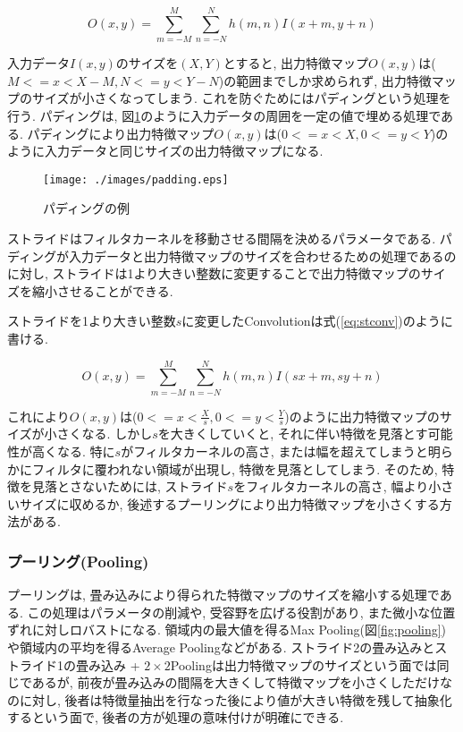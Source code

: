 \begin{equation}
  O(x, y) = \sum_{m=-M}^M \sum_{n=-N}^N h(m,n)I(x+m, y+n) \label{eq:conv1}
\end{equation}

入力データ$I(x, y)$のサイズを$(X, Y)$とすると, 出力特徴マップ$O(x, y)$は($M<=x<X-M, N<=y<Y-N$)の範囲までしか求められず, 出力特徴マップのサイズが小さくなってしまう. これを防ぐためにはパディングという処理を行う. パディングは, 図\ref{fig:padding}のように入力データの周囲を一定の値で埋める処理である. パディングにより出力特徴マップ$O(x, y)$は($0<=x<X, 0<=y<Y$)のように入力データと同じサイズの出力特徴マップになる.  
\begin{figure}[H]
  \centering
  \texttt{[image: ./images/padding.eps]}
  \caption{パディングの例}
  \label{fig:padding}
\end{figure}

ストライドはフィルタカーネルを移動させる間隔を決めるパラメータである. パディングが入力データと出力特徴マップのサイズを合わせるための処理であるのに対し, ストライドは1より大きい整数に変更することで出力特徴マップのサイズを縮小させることができる.  

ストライドを1より大きい整数$s$に変更したConvolutionは式(\ref{eq:stconv})のように書ける.

\begin{equation}
 O(x, y) = \sum_{m=-M}^M \sum_{n=-N}^N h(m,n)I(sx+m, sy+n) \label{eq:stconv}
\end{equation}

これにより$O(x,y)$は($0<=x<\frac{X}{s}, 0<=y<\frac{Y}{s}$)のように出力特徴マップのサイズが小さくなる. しかし$s$を大きくしていくと, それに伴い特徴を見落とす可能性が高くなる. 特に$s$がフィルタカーネルの高さ, または幅を超えてしまうと明らかにフィルタに覆われない領域が出現し, 特徴を見落としてしまう. そのため, 特徴を見落とさないためには, ストライド$s$をフィルタカーネルの高さ, 幅より小さいサイズに収めるか, 後述するプーリングにより出力特徴マップを小さくする方法がある. 



\subsubsection*{プーリング(Pooling)}
プーリングは, 畳み込みにより得られた特徴マップのサイズを縮小する処理である. この処理はパラメータの削減や, 受容野を広げる役割があり, また微小な位置ずれに対しロバストになる. 領域内の最大値を得るMax Pooling(図\ref{fig:pooling})や領域内の平均を得るAverage Poolingなどがある. ストライド2の畳み込みとストライド1の畳み込み + $2\times2$Poolingは出力特徴マップのサイズという面では同じであるが, 前夜が畳み込みの間隔を大きくして特徴マップを小さくしただけなのに対し, 後者は特徴量抽出を行なった後により値が大きい特徴を残して抽象化するという面で, 後者の方が処理の意味付けが明確にできる.

